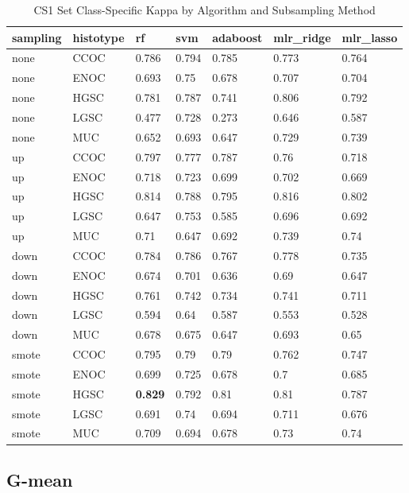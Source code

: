 \documentclass[
]{report}
\begin{document}
\begin{table}

\caption{\label{tab:cs1-kappa-class-table}CS1 Set Class-Specific Kappa by Algorithm and Subsampling Method}
\centering
\begin{tabular}[t]{l|l|l|l|l|l|l}
\hline
sampling & histotype & rf & svm & adaboost & mlr\_ridge & mlr\_lasso\\
\hline
none & CCOC & 0.786 & 0.794 & 0.785 & 0.773 & 0.764\\
\hline
none & ENOC & 0.693 & 0.75 & 0.678 & 0.707 & 0.704\\
\hline
none & HGSC & 0.781 & 0.787 & 0.741 & 0.806 & 0.792\\
\hline
none & LGSC & 0.477 & 0.728 & 0.273 & 0.646 & 0.587\\
\hline
none & MUC & 0.652 & 0.693 & 0.647 & 0.729 & 0.739\\
\hline
up & CCOC & 0.797 & 0.777 & 0.787 & 0.76 & 0.718\\
\hline
up & ENOC & 0.718 & 0.723 & 0.699 & 0.702 & 0.669\\
\hline
up & HGSC & 0.814 & 0.788 & 0.795 & 0.816 & 0.802\\
\hline
up & LGSC & 0.647 & 0.753 & 0.585 & 0.696 & 0.692\\
\hline
up & MUC & 0.71 & 0.647 & 0.692 & 0.739 & 0.74\\
\hline
down & CCOC & 0.784 & 0.786 & 0.767 & 0.778 & 0.735\\
\hline
down & ENOC & 0.674 & 0.701 & 0.636 & 0.69 & 0.647\\
\hline
down & HGSC & 0.761 & 0.742 & 0.734 & 0.741 & 0.711\\
\hline
down & LGSC & 0.594 & 0.64 & 0.587 & 0.553 & 0.528\\
\hline
down & MUC & 0.678 & 0.675 & 0.647 & 0.693 & 0.65\\
\hline
smote & CCOC & 0.795 & 0.79 & 0.79 & 0.762 & 0.747\\
\hline
smote & ENOC & 0.699 & 0.725 & 0.678 & 0.7 & 0.685\\
\hline
smote & HGSC & \textbf{0.829} & 0.792 & 0.81 & 0.81 & 0.787\\
\hline
smote & LGSC & 0.691 & 0.74 & 0.694 & 0.711 & 0.676\\
\hline
smote & MUC & 0.709 & 0.694 & 0.678 & 0.73 & 0.74\\
\hline
\end{tabular}
\end{table}

\hypertarget{g-mean-1}{%
\subsection{G-mean}\label{g-mean-1}}
\end{document}
